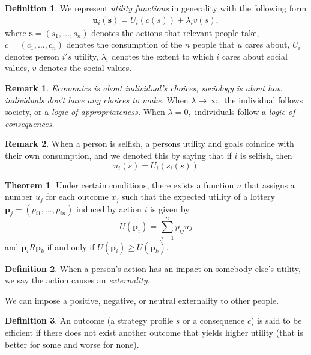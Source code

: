 \documentclass[10pt, oneside]{article}
\theoremstyle{definition}
\newtheorem{thm}{Theorem}
\newtheorem{defn}{Definition}
\newtheorem{rem}{Remark}
\begin{document}
\begin{defn}
    We represent \textit{utility functions} in generality with the following form
    \begin{align}
    \textbf{u}_i (\textbf{s}) = U_i(c(s)) + \lambda_i v(s),    
    \end{align}
     where $\textbf{s} = (s_1, \dots, s_n)$ denotes the actions that relevant people take, $c = (c_1, \dots, c_n)$ denotes the consumption of the $n$ people that $u$ cares about, $U_i$ denotes person $i's$ utility, $\lambda_i$ denotes the extent to which $i$ cares about social values, $v$ denotes the social values.
\end{defn}
\begin{rem}
    \textit{Economics is about individual's choices, sociology is about how individuals don't have any choices to make.} When $\lambda \to \infty,$ the individual follows society, or a \textit{logic of appropriateness.} When $\lambda = 0,$ individuals follow a \textit{logic of consequences.}
\end{rem}
\begin{rem}
    When a person is selfish, a persons utility and goals coincide with their own consumption, and we denoted this by saying that if $i$ is selfish, then
    \[u_i(s) = U_i(s_i(s))\]
\end{rem}

\begin{thm}
    Under certain conditions, there exists a function $u$ that assigns a number $u_j$ for each outcome $x_j$ such that the expected utility of a lottery $\textbf{p}_j = (p_{i1}, \dots, p_{in})$ induced by action $i$ is given by 
    \[U(\textbf{p}_i) = \sum_{j=1}^n p_{ij} uj\] and $\textbf{p}_i R \textbf{p}_k$ if and only if $U(\textbf{p}_i)\geq U(\textbf{p}_k).$
\end{thm}

\begin{defn}
    When a person's action has an impact on somebody else's utility, we say the action causes an \textit{externality.}
\end{defn}
We can impose a positive, negative, or neutral externality to other people.
\begin{defn}
    An outcome (a strategy profile $s$ or a consequence $c$) is said to be efficient if there does not exist another outcome that yields higher utility (that is better for some and worse for none).
\end{defn}
\newpage
\end{document}
